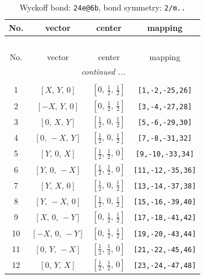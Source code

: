 \documentclass[fleqn,8pt]{jsarticle}
\begin{document}
\renewcommand{\arraystretch}{1.2}
\begin{longtable}{cccc}
\caption{Wyckoff bond: {\tt 24e@6b}, bond symmetry: {\tt 2/m..}}
 \\
 \hline \hline
No. & vector & center & mapping \\ \hline \endfirsthead

\multicolumn{3}{l}{\tablename\ \thetable{}} \\
 \hline \hline
No. & vector & center & mapping \\ \hline \endhead

 \hline \hline
\multicolumn{3}{r}{\footnotesize\it continued ...} \\ \endfoot

 \hline \hline
\multicolumn{3}{r}{} \\ \endlastfoot

1 & $\left[ X,\, Y,\, 0 \right]$ & $\left[ 0,\, \frac{1}{2},\, \frac{1}{2} \right]$ & {\tt [1,-2,-25,26]} \\ \hline
2 & $\left[ - X,\, Y,\, 0 \right]$ & $\left[ 0,\, \frac{1}{2},\, \frac{1}{2} \right]$ & {\tt [3,-4,-27,28]} \\ \hline
3 & $\left[ 0,\, X,\, Y \right]$ & $\left[ \frac{1}{2},\, 0,\, \frac{1}{2} \right]$ & {\tt [5,-6,-29,30]} \\ \hline
4 & $\left[ 0,\, - X,\, Y \right]$ & $\left[ \frac{1}{2},\, 0,\, \frac{1}{2} \right]$ & {\tt [7,-8,-31,32]} \\ \hline
5 & $\left[ Y,\, 0,\, X \right]$ & $\left[ \frac{1}{2},\, \frac{1}{2},\, 0 \right]$ & {\tt [9,-10,-33,34]} \\ \hline
6 & $\left[ Y,\, 0,\, - X \right]$ & $\left[ \frac{1}{2},\, \frac{1}{2},\, 0 \right]$ & {\tt [11,-12,-35,36]} \\ \hline
7 & $\left[ Y,\, X,\, 0 \right]$ & $\left[ \frac{1}{2},\, 0,\, \frac{1}{2} \right]$ & {\tt [13,-14,-37,38]} \\ \hline
8 & $\left[ Y,\, - X,\, 0 \right]$ & $\left[ \frac{1}{2},\, 0,\, \frac{1}{2} \right]$ & {\tt [15,-16,-39,40]} \\ \hline
9 & $\left[ X,\, 0,\, - Y \right]$ & $\left[ 0,\, \frac{1}{2},\, \frac{1}{2} \right]$ & {\tt [17,-18,-41,42]} \\ \hline
10 & $\left[ - X,\, 0,\, - Y \right]$ & $\left[ 0,\, \frac{1}{2},\, \frac{1}{2} \right]$ & {\tt [19,-20,-43,44]} \\ \hline
11 & $\left[ 0,\, Y,\, - X \right]$ & $\left[ \frac{1}{2},\, \frac{1}{2},\, 0 \right]$ & {\tt [21,-22,-45,46]} \\ \hline
12 & $\left[ 0,\, Y,\, X \right]$ & $\left[ \frac{1}{2},\, \frac{1}{2},\, 0 \right]$ & {\tt [23,-24,-47,48]} \\
\end{longtable}
\end{document}
